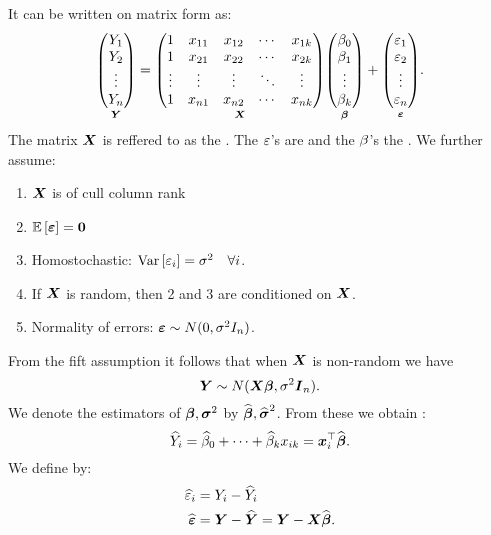 It can be written on matrix form as:
$$
    \underset{\boldsymbol{Y}}{
    \begin{pmatrix}
        Y_1 \\
        Y_2 \\
        \vdots \\
        Y_n
    \end{pmatrix}}
    =
    \underset{\boldsymbol{X}}{
    \begin{pmatrix}
        1 & x_{11} & x_{12} & \cdots & x_{1k} \\
        1 & x_{21} & x_{22} & \cdots & x_{2k} \\
        \vdots & \vdots & \vdots & \ddots & \vdots \\
        1 & x_{n1} & x_{n2} & \cdots & x_{nk}
    \end{pmatrix}}
    \underset{\boldsymbol{\beta}}{
    \begin{pmatrix}
        \beta_0 \\
        \beta_1 \\
        \vdots \\
        \beta_k
    \end{pmatrix}}
    +
    \underset{\boldsymbol{\varepsilon}}{
    \begin{pmatrix}
        \varepsilon_1 \\
        \varepsilon_2 \\
        \vdots \\
        \varepsilon_n
    \end{pmatrix}}.
$$
The matrix $\boldsymbol{X}$ is reffered to as the . The $\varepsilon$'s are  and the $\beta$'s the .
We further assume:
\begin{enumerate}
    \item $\boldsymbol{X}$ is of cull column rank
    \item $\mathbb{E}\left[\boldsymbol{\varepsilon}\right]=\boldsymbol{0}$
    \item Homostochastic: $\mathrm{Var}\left[\varepsilon_i\right] = \sigma^2 \quad\forall i$.
    \item If $\boldsymbol{X}$ is random, then 2 and 3 are conditioned on $\boldsymbol{X}$. 
    \item Normality of errors: $\boldsymbol{\varepsilon}\sim N(0, \sigma^2I_n)$.
\end{enumerate}
From the fift assumption it follows that when $\boldsymbol{X}$ is non-random we have
$$
    \boldsymbol{Y} \sim N(\boldsymbol{X}\boldsymbol{\beta}, \sigma^2 \boldsymbol{I}_n).
$$
We denote the estimators of $\boldsymbol{\beta}, \boldsymbol{\sigma}^2$ by $\widehat{\boldsymbol{\beta}}, \widehat{\boldsymbol{\sigma}}^2$. From these we obtain :
$$
    \widehat{Y}_i = \widehat{\beta}_0 + \cdots + \widehat{\beta}_k x_{ik} = \boldsymbol{x}_i^\top\widehat{\boldsymbol{\beta}}.
$$
We define  by:
\begin{align*}
    \widehat{\varepsilon}_i &= Y_i-\widehat{Y}_i \\
    \widehat{\boldsymbol{\varepsilon}} &= \boldsymbol{Y}-\widehat{\boldsymbol{Y}} = \boldsymbol{Y}-\boldsymbol{X}\widehat{\boldsymbol{\beta}}.
\end{align*}

